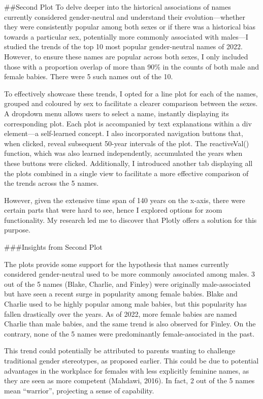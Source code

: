 \documentclass[
]{article}
\begin{document}
\#\#Second Plot To delve deeper into the historical associations of
names currently considered gender-neutral and understand their
evolution---whether they were consistently popular among both sexes or
if there was a historical bias towards a particular sex, potentially
more commonly associated with males---I studied the trends of the top 10
most popular gender-neutral names of 2022. However, to ensure these
names are popular across both sexes, I only included those with a
proportion overlap of more than 90\% in the counts of both male and
female babies. There were 5 such names out of the 10.

To effectively showcase these trends, I opted for a line plot for each
of the names, grouped and coloured by sex to facilitate a clearer
comparison between the sexes. A dropdown menu allows users to select a
name, instantly displaying its corresponding plot. Each plot is
accompanied by text explanations within a div element---a self-learned
concept. I also incorporated navigation buttons that, when clicked,
reveal subsequent 50-year intervals of the plot. The reactiveVal()
function, which was also learned independently, accumulated the years
when these buttons were clicked. Additionally, I introduced another tab
displaying all the plots combined in a single view to facilitate a more
effective comparison of the trends across the 5 names.

However, given the extensive time span of 140 years on the x-axis, there
were certain parts that were hard to see, hence I explored options for
zoom functionality. My research led me to discover that Plotly offers a
solution for this purpose.

\#\#\#Insights from Second Plot

The plots provide some support for the hypothesis that names currently
considered gender-neutral used to be more commonly associated among
males. 3 out of the 5 names (Blake, Charlie, and Finley) were originally
male-associated but have seen a recent surge in popularity among female
babies. Blake and Charlie used to be highly popular among male babies,
but this popularity has fallen drastically over the years. As of 2022,
more female babies are named Charlie than male babies, and the same
trend is also observed for Finley. On the contrary, none of the 5 names
were predominantly female-associated in the past.

This trend could potentially be attributed to parents wanting to
challenge traditional gender stereotypes, as proposed earlier. This
could be due to potential advantages in the workplace for females with
less explicitly feminine names, as they are seen as more competent
(Mahdawi, 2016). In fact, 2 out of the 5 names mean ``warrior'',
projecting a sense of capability.
\end{document}

